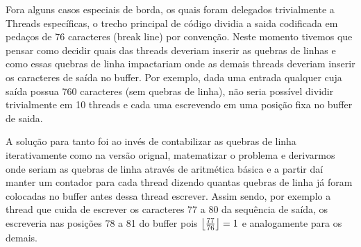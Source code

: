 \documentclass[final,12pt,a4paper]{elsarticle}
\DeclarePairedDelimiter\floor{\lfloor}{\rfloor}
\begin{document}
Fora alguns casos especiais de borda, os quais foram delegados trivialmente a Threads específicas, o trecho principal de código dividia a saida codificada em pedaços de 76 caracteres (break line) por convenção. Neste momento tivemos que pensar como decidir quais das threads deveriam inserir as quebras de linhas e como essas quebras de linha impactariam onde as demais threads deveriam inserir os caracteres de saída no buffer. Por exemplo, dada uma entrada qualquer cuja saída possua 760 caracteres (sem quebras de linha), não seria possível dividir trivialmente em 10 threads e cada uma escrevendo em uma posição fixa no buffer de saida.

A solução para tanto foi ao invés de contabilizar as quebras de linha iterativamente como na versão orignal, matematizar o problema e derivarmos onde seriam as quebras de linha através de aritmética básica e a partir daí manter um contador para cada thread dizendo quantas quebras de linha já foram colocadas no buffer antes dessa thread escrever. Assim sendo, por exemplo a thread que cuida de escrever os caracteres 77 a 80 da sequência de saída, os escreveria nas posições 78 a 81 do buffer pois $\floor*{\frac{77}{76}} = 1$ e analogamente para os demais.
\end{document}
